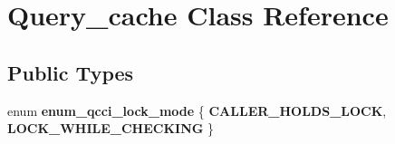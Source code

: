 \hypertarget{classQuery__cache}{}\section{Query\+\_\+cache Class Reference}
\label{classQuery__cache}
\subsection*{Public Types}
\begin{DoxyCompactItemize}
\item 
\mbox{\label{classQuery__cache_ab5f9da7c64dcadd51213964d2288c14c}} 
enum {\bfseries enum\+\_\+qcci\+\_\+lock\+\_\+mode} \{ {\bfseries C\+A\+L\+L\+E\+R\+\_\+\+H\+O\+L\+D\+S\+\_\+\+L\+O\+CK}, 
{\bfseries L\+O\+C\+K\+\_\+\+W\+H\+I\+L\+E\+\_\+\+C\+H\+E\+C\+K\+I\+NG}
 \}
\end{DoxyCompactItemize}
